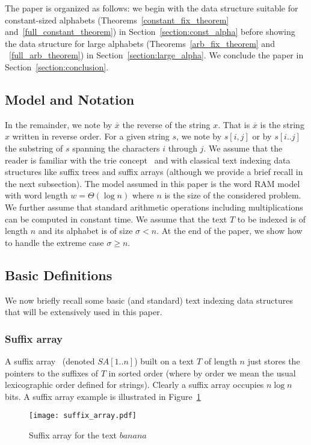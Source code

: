 \documentclass{article}
\newcommand{\?}{\mskip1.5mu}
\begin{document}
The paper is organized as follows: we begin with the data structure suitable for constant-sized alphabets (Theorems~\ref{constant_fix_theorem} and~\ref{full_constant_theorem}) in Section~\ref{section:const_alpha} before showing the data structure for large alphabets (Theorems~\ref{arb_fix_theorem} and ~\ref{full_arb_theorem}) in Section~\ref{section:large_alpha}. We  conclude the paper in Section~\ref{section:conclusion}.

\subsection{Model and Notation}
In the remainder, we note by $\overline{x}$ the reverse of the string $x$. That is $\overline{x}$ is the string $x$  written in reverse order. For a given string $s$, we note by $s[i,j]$ or by $s[i..j]$ the substring of $s$ spanning the characters $i$ through $j$. We assume that the reader is familiar with the trie concept~\cite{Fr60,Kn73} and with classical text indexing data structures like suffix trees and suffix arrays (although we provide a brief recall in the next subsection). The model assumed in this paper is the word RAM model with word length $w=\Theta(\log n)$ where $n$ is the size of the considered problem. We further assume that standard arithmetic operations including multiplications can be computed in constant time. We assume that the text $T$ to be indexed is of length $n$ and its alphabet is of size $\sigma<n$. At the end of the paper, we show how to handle the extreme case $\sigma\geq n$. 
\subsection{Basic Definitions}
We now briefly recall some basic (and standard) text indexing data structures that will be extensively used in this paper. 
\subsubsection{Suffix array}
A suffix array~\cite{MM93} (denoted $SA[1..n]$) built on a text $T$ of length $n$ just stores the pointers to the suffixes of $T$ in sorted order (where by order we mean the usual lexicographic order defined for strings). Clearly a suffix array occupies $n\log n$ bits. A suffix array example is illustrated in Figure~\ref{pic:suffix_array}
\begin{figure}[htb] 
\centering\texttt{[image: suffix\_array.pdf]} 
\caption{Suffix array for the text $banana$} \label{pic:suffix_array} \end{figure}
\end{document}
